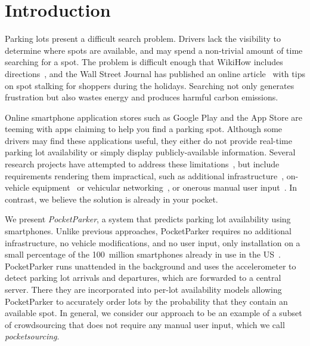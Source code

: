 \section{Introduction}

Parking lots present a difficult search problem. Drivers lack the visibility
to determine where spots are available, and may spend a non-trivial amount of
time searching for a spot. The problem is difficult enough that WikiHow
includes directions~\cite{wikihow-park}, and the Wall Street Journal has
published an online article~\cite{wsj-park} with tips on spot stalking for
shoppers during the holidays. Searching not only generates frustration but
also wastes energy and produces harmful carbon emissions.

Online smartphone application stores such as Google Play and the App Store
are teeming with apps claiming to help you find a parking spot. Although some
drivers may find these applications useful, they either do not provide
real-time parking lot availability or simply display publicly-available
information. Several research projects have attempted to address these
limitations~\cite{4212497, Chen:2012:COS, Delot:2009:CRP, 5062057,
Mathur:2010:PDS}, but include requirements rendering them impractical, such
as additional infrastructure~\cite{5062057}, on-vehicle
equipment~\cite{Mathur:2010:PDS} or vehicular
networking~\cite{Delot:2009:CRP, Mathur:2010:PDS}, or onerous manual user
input~\cite{Chen:2012:COS}. In contrast, we believe the solution is already
in your pocket.

We present \textit{PocketParker}, a system that predicts parking lot
availability using smartphones. Unlike previous approaches, PocketParker
requires no additional infrastructure, no vehicle modifications, and no user
input, only installation on a small percentage of the 100~million smartphones
already in use in the US~\cite{smartphone-numbers}. PocketParker runs
unattended in the background and uses the accelerometer to detect parking lot
arrivals and departures, which are forwarded to a central server. There they
are incorporated into per-lot availability models allowing PocketParker to
accurately order lots by the probability that they contain an available spot.
In general, we consider our approach to be an example of a subset of
crowdsourcing that does not require any manual user input, which we call
\textit{pocketsourcing}.

